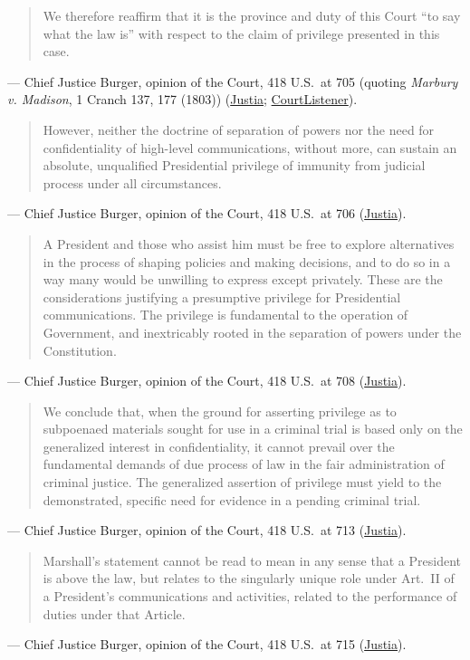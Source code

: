 \documentclass[12pt]{article}
\begin{document}
\begin{quote}
We therefore reaffirm that it is the province and duty of this Court ``to say what the law is'' with respect to the claim of privilege presented in this case.
\end{quote}
--- Chief Justice Burger, opinion of the Court, 418 U.S.\ at 705 (quoting \textit{Marbury v. Madison}, 1 Cranch 137, 177 (1803)) (\href{https://supreme.justia.com/cases/federal/us/418/683/}{Justia}; \href{https://www.courtlistener.com/opinion/109101/united-states-v-nixon/}{CourtListener}).

\begin{quote}
However, neither the doctrine of separation of powers nor the need for confidentiality of high-level communications, without more, can sustain an absolute, unqualified Presidential privilege of immunity from judicial process under all circumstances.
\end{quote}
--- Chief Justice Burger, opinion of the Court, 418 U.S.\ at 706 (\href{https://supreme.justia.com/cases/federal/us/418/683/}{Justia}).

\begin{quote}
A President and those who assist him must be free to explore alternatives in the process of shaping policies and making decisions, and to do so in a way many would be unwilling to express except privately. These are the considerations justifying a presumptive privilege for Presidential communications. The privilege is fundamental to the operation of Government, and inextricably rooted in the separation of powers under the Constitution.
\end{quote}
--- Chief Justice Burger, opinion of the Court, 418 U.S.\ at 708 (\href{https://supreme.justia.com/cases/federal/us/418/683/}{Justia}).

\begin{quote}
We conclude that, when the ground for asserting privilege as to subpoenaed materials sought for use in a criminal trial is based only on the generalized interest in confidentiality, it cannot prevail over the fundamental demands of due process of law in the fair administration of criminal justice. The generalized assertion of privilege must yield to the demonstrated, specific need for evidence in a pending criminal trial.
\end{quote}
--- Chief Justice Burger, opinion of the Court, 418 U.S.\ at 713 (\href{https://supreme.justia.com/cases/federal/us/418/683/}{Justia}).

\begin{quote}
Marshall's statement cannot be read to mean in any sense that a President is above the law, but relates to the singularly unique role under Art.\ II of a President's communications and activities, related to the performance of duties under that Article.
\end{quote}
--- Chief Justice Burger, opinion of the Court, 418 U.S.\ at 715 (\href{https://supreme.justia.com/cases/federal/us/418/683/}{Justia}).
\end{document}
